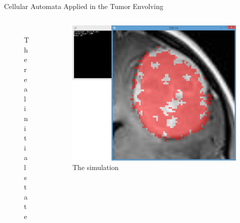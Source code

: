 \documentclass{beamer}
\begin{document}
\begin{frame}{Cellular Automata Applied in the Tumor Envolving}

\begin{columns} %
  \begin{column}{0.5\textwidth} %
  \begin{figure}[!ht]
   \includegraphics[scale=3.0,keepaspectratio]{images/ac_EntradaExemplo.png}
   \caption{The real initial state}
     \end{figure}
  \end{column}
   \begin{column}{1.0\textwidth}  %
     \begin{figure}[!ht]
   \includegraphics[scale=0.2,keepaspectratio]{images/ac_SimulacaoExemplo.png}
   
      \caption{The simulation}
     \end{figure}
  \end{column} %
 \end{columns}
  

\end{frame}



\end{document}
